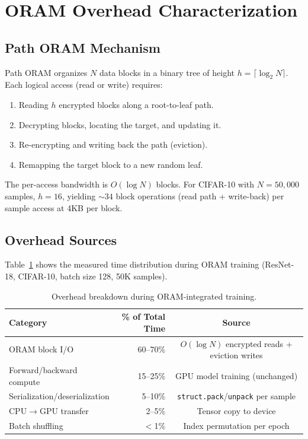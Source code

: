 \documentclass[11pt]{article}
\begin{document}
\section{ORAM Overhead Characterization}
\label{sec:overhead}

\subsection{Path ORAM Mechanism}

Path ORAM organizes $N$ data blocks in a binary tree of height $h = \lceil \log_2 N \rceil$.
Each logical access (read or write) requires:
\begin{enumerate}
    \item Reading $h$ encrypted blocks along a root-to-leaf path.
    \item Decrypting blocks, locating the target, and updating it.
    \item Re-encrypting and writing back the path (eviction).
    \item Remapping the target block to a new random leaf.
\end{enumerate}

The per-access bandwidth is $O(\log N)$ blocks.
For CIFAR-10 with $N = 50{,}000$ samples, $h = 16$, yielding ${\sim}34$ block operations (read path + write-back) per sample access at 4KB per block.

\subsection{Overhead Sources}

Table~\ref{tab:breakdown} shows the measured time distribution during ORAM training (ResNet-18, CIFAR-10, batch size 128, 50K samples).

\begin{table}[ht]
\centering
\caption{Overhead breakdown during ORAM-integrated training.}
\label{tab:breakdown}
\begin{tabular}{@{}lrc@{}}
\toprule
\textbf{Category} & \textbf{\% of Total Time} & \textbf{Source} \\
\midrule
ORAM block I/O         & 60--70\% & $O(\log N)$ encrypted reads + eviction writes \\
Forward/backward compute & 15--25\% & GPU model training (unchanged) \\
Serialization/deserialization & 5--10\% & \texttt{struct.pack}/\texttt{unpack} per sample \\
CPU$\to$GPU transfer   & 2--5\%  & Tensor copy to device \\
Batch shuffling         & $<$1\%  & Index permutation per epoch \\
\bottomrule
\end{tabular}
\end{table}
\end{document}

